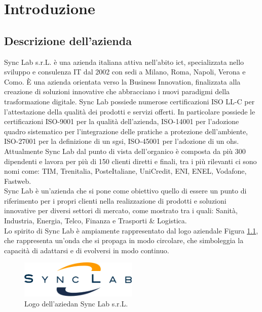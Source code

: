 \chapter{Introduzione}
\label{cap:introduzione}
\section{Descrizione dell'azienda}
Sync Lab s.r.L. è una azienda italiana attiva nell'abito \gls{ict}{}, specializzata nello sviluppo e consulenza IT dal 2002 con sedi a 
Milano, Roma, Napoli, Verona e Como. È una azienda orientata verso la Business Innovation, finalizzata alla 
creazione di soluzioni innovative che abbracciano i nuovi paradigmi della trasformazione digitale.
Sync Lab possiede numerose certificazioni ISO LL-C per l'attestazione della 
qualità dei prodotti e servizi offerti. In particolare possiede le certificazioni 
ISO-9001 per la qualità dell'azienda, ISO-14001 per l'adozione quadro sistematico per l'integrazione delle pratiche a protezione dell'ambiente, ISO-27001 per la definizione di un \gls{sgsi}{}, ISO-45001 per l'adozione di un \gls{ohs}{}.
\\
Attualmente Sync Lab dal punto di vista dell'organico è composta da più 300 dipendenti e lavora per più di 150 clienti diretti e finali, tra i più rilevanti ci sono nomi come: TIM, Trenitalia, PosteItaliane, UniCredit, ENI, ENEL, Vodafone, Fastweb.
\\
Sync Lab è un'azienda che si pone come obiettivo quello di essere un punto di riferimento per i propri clienti nella realizzazione di prodotti e soluzioni innovative per diversi settori di mercato, come mostrato  tra i quali: Sanità, Industria, Energia, Telco, Finanza e Trasporti \& Logistica.\\
Lo spirito di Sync Lab è ampiamente rappresentato dal logo aziendale Figura \ref{figure:logo_azienda}, che rappresenta un'onda che si propaga in modo circolare, che simboleggia la capacità di adattarsi e di evolversi in modo continuo.\\


\begin{figure}[htbp]  
\centering
    \includegraphics[width=0.5\textwidth]{images/introduzione/logo_azienda.png}
    \caption{Logo dell'aziedan Sync Lab s.r.L.}
    \label{figure:logo_azienda}
\end{figure}
\pagebreak
